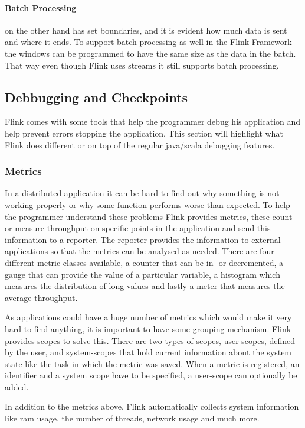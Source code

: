 \paragraph{Batch Processing} on the other hand has set boundaries, and it is evident how much data is sent and where it ends. To support batch processing as well in the Flink Framework the windows can be programmed to have the same size as the data in the batch. That way even though Flink uses streams it still supports batch processing.

\subsection{Debbugging and Checkpoints}
\label{debuggingAndCheckpoints}
Flink comes with some tools that help the programmer debug his application and help prevent errors stopping the application. This section will highlight what Flink does different or on top of the regular java/scala debugging features.

\subsubsection{Metrics}
\label{metrics}
In a distributed application it can be hard to find out why something is not working properly or why some function performs worse than expected. To help the programmer understand these problems Flink provides metrics, these count or measure throughput on specific points in the application and send this information to a reporter. The reporter provides the information to external applications so that the metrics can be analysed as needed. There are four different metric classes available, a counter that can be in- or decremented, a gauge that can provide the value of a particular variable, a histogram which measures the distribution of long values and lastly a meter that measures the average throughput.

As applications could have a huge number of metrics which would make it very hard to find anything, it is important to have some grouping mechanism. Flink provides scopes to solve this. There are two types of scopes, user-scopes, defined by the user, and system-scopes that hold current information about the system state like the task in which the metric was saved. When a metric is registered, an identifier and a system scope have to be specified, a user-scope can optionally be added.

In addition to the metrics above, Flink automatically collects system information like ram usage, the number of threads, network usage and much more.

